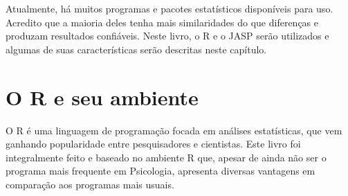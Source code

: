 \documentclass[
]{book}
\begin{document}
Atualmente, há muitos programas e pacotes estatísticos disponíveis para uso. Acredito que a maioria deles tenha mais similaridades do que diferenças e produzam resultados confiáveis. Neste livro, o R e o JASP serão utilizados e algumas de suas características serão descritas neste capítulo.

\hypertarget{o-r-e-seu-ambiente}{%
\section{O R e seu ambiente}\label{o-r-e-seu-ambiente}}

O R é uma linguagem de programação focada em análises estatísticas, que vem ganhando popularidade entre pesquisadores e cientistas. Este livro foi integralmente feito e baseado no ambiente R que, apesar de ainda não ser o programa mais frequente em Psicologia, apresenta diversas vantagens em comparação aos programas mais usuais.
\end{document}
